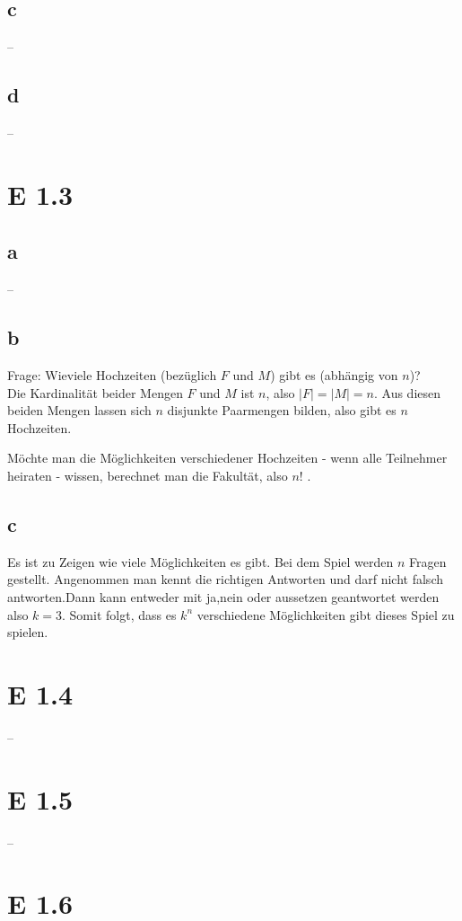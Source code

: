 \documentclass[12pt]{article}
\begin{document}
\subsection*{c}
--

\subsection*{d}
--

\section*{E 1.3}
\subsection*{a}
--

\subsection*{b}
Frage: Wieviele Hochzeiten (bezüglich $F$ und $M$) gibt es (abhängig von $n$)? \\

Die Kardinalität beider Mengen $F$ und $M$ ist $n$, also $|F| =|M| = n$. Aus diesen beiden Mengen
lassen sich $n$ disjunkte Paarmengen bilden, also gibt es $n$ Hochzeiten.


Möchte man die Möglichkeiten verschiedener Hochzeiten - wenn alle Teilnehmer heiraten -
 wissen, berechnet man die Fakultät, also $n!$ .

\subsection*{c}
Es ist zu Zeigen wie viele Möglichkeiten es gibt. Bei dem Spiel werden $n$ Fragen gestellt. Angenommen
man kennt die richtigen Antworten und darf nicht falsch antworten.Dann kann entweder mit ja,nein oder
aussetzen geantwortet werden also $k=3$. Somit folgt, dass es $k^n$ verschiedene Möglichkeiten gibt dieses
Spiel zu spielen. 

\section*{E 1.4}
--

\section*{E 1.5}
--


\section*{E 1.6}
\end{document}
